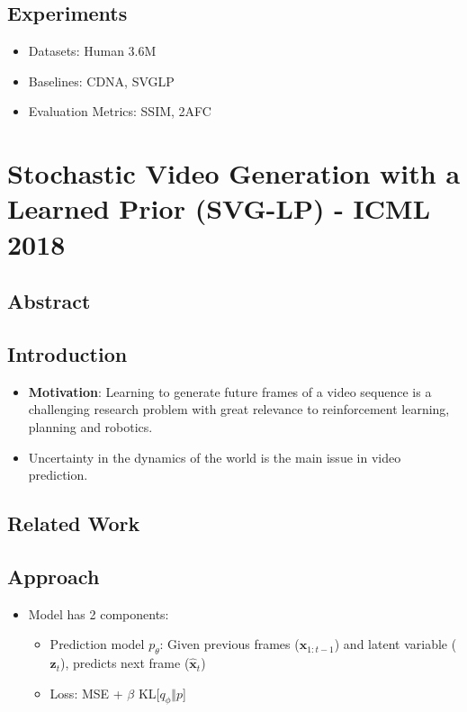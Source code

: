 \documentclass{article}
\begin{document}
    \subsection{Experiments}\label{subsec:Hierarchical_Long_term_Video_Prediction_without_Supervision:experiments}
    \begin{itemize}
        \item Datasets: Human 3.6M
        \item Baselines: CDNA, SVGLP
        \item Evaluation Metrics: SSIM, 2AFC
    \end{itemize}
    \newpage


    \section{Stochastic Video Generation with a Learned Prior (SVG-LP) - ICML 2018}\label{sec:Stochastic_Video_Generation_with_a_Learned_Prior_(SVG_LP)_ICML_2018}
    \subsection*{Abstract}

    \subsection{Introduction}\label{subsec:Stochastic_Video_Generation_with_a_Learned_Prior_(SVG_LP)_ICML_2018:introduction}
    \begin{itemize}
        \item \textbf{Motivation}: Learning to generate future frames of a video sequence is a challenging research problem with great relevance to reinforcement learning, planning and robotics.
        \item Uncertainty in the dynamics of the world is the main issue in video prediction.
    \end{itemize}

    \subsection{Related Work}\label{subsec:Stochastic_Video_Generation_with_a_Learned_Prior_(SVG_LP)_ICML_2018:related-work}

    \subsection{Approach}\label{subsec:Stochastic_Video_Generation_with_a_Learned_Prior_(SVG_LP)_ICML_2018:approach}
    \begin{itemize}
        \item Model has 2 components:
        \begin{itemize}
            \item Prediction model $p_\theta$: Given previous frames ($\textbf{x}_{1:t-1}$) and latent variable ($\textbf{z}_t$), predicts next frame ($\hat{\textbf{x}}_t$)
            \item Loss: MSE + $\beta$ KL[$q_\phi \Vert p$]
        \end{itemize}
    \end{itemize}
    \newpage
\end{document}
